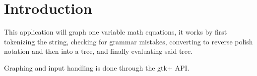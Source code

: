 \hypertarget{index_intro}{}\section{Introduction}\label{index_intro}
This application will graph one variable math equations, it works by first tokenizing the string, checking for grammar mistakes, converting to reverse polish notation and then into a tree, and finally evaluating said tree.

Graphing and input handling is done through the gtk+ A\-P\-I. 